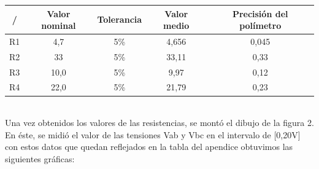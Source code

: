 \documentclass[a4paper,11pt]{article}
\begin{document}
\begin{tabular}{|c|c|c|c|c|}
\hline 
/ & Valor nominal & Tolerancia & Valor medio & Precisión del polímetro \\ 
\hline 
R1 & 4,7 & 5\% & 4,656 & 0,045 \\ 
\hline 
R2 & 33 & 5\% & 33,11 & 0,33 \\ 
\hline 
R3 & 10,0 & 5\% & 9,97 & 0,12 \\ 
\hline 
R4 & 22,0 & 5\% & 21,79 & 0,23 \\ 
\hline 
\end{tabular}\\

Una vez obtenidos los valores de las resistencias, se montó el dibujo de la figura 2. En éste, se midió el valor de las tensiones Vab y Vbc en el intervalo de [0,20V] con estos datos que quedan reflejados en la tabla del apendice obtuvimos las siguientes gráficas:
\end{document}
